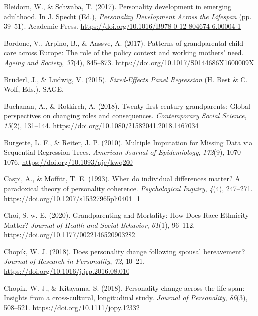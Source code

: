 \documentclass[
  english,
  man,floatsintext]{apa7}
\begin{document}
\leavevmode\hypertarget{ref-bleidornPersonalityDevelopmentEmerging2017}{}%
Bleidorn, W., \& Schwaba, T. (2017). Personality development in emerging adulthood. In J. Specht (Ed.), \emph{Personality Development Across the Lifespan} (pp. 39--51). Academic Press. \url{https://doi.org/10.1016/B978-0-12-804674-6.00004-1}

\leavevmode\hypertarget{ref-bordonePatternsGrandparentalChild2017}{}%
Bordone, V., Arpino, B., \& Aassve, A. (2017). Patterns of grandparental child care across Europe: The role of the policy context and working mothers' need. \emph{Ageing and Society}, \emph{37}(4), 845--873. \url{https://doi.org/10.1017/S0144686X1600009X}

\leavevmode\hypertarget{ref-bruderlFixedEffectsPanelRegression2015}{}%
Brüderl, J., \& Ludwig, V. (2015). \emph{Fixed-Effects Panel Regression} (H. Best \& C. Wolf, Eds.). SAGE.

\leavevmode\hypertarget{ref-buchananTwentyfirstCenturyGrandparents2018}{}%
Buchanan, A., \& Rotkirch, A. (2018). Twenty-first century grandparents: Global perspectives on changing roles and consequences. \emph{Contemporary Social Science}, \emph{13}(2), 131--144. \url{https://doi.org/10.1080/21582041.2018.1467034}

\leavevmode\hypertarget{ref-burgetteMultipleImputationMissing2010}{}%
Burgette, L. F., \& Reiter, J. P. (2010). Multiple Imputation for Missing Data via Sequential Regression Trees. \emph{American Journal of Epidemiology}, \emph{172}(9), 1070--1076. \url{https://doi.org/10.1093/aje/kwq260}

\leavevmode\hypertarget{ref-caspiWhenIndividualDifferences1993}{}%
Caspi, A., \& Moffitt, T. E. (1993). When do individual differences matter? A paradoxical theory of personality coherence. \emph{Psychological Inquiry}, \emph{4}(4), 247--271. \url{https://doi.org/10.1207/s15327965pli0404_1}

\leavevmode\hypertarget{ref-choiGrandparentingMortalityHow2020}{}%
Choi, S.-w. E. (2020). Grandparenting and Mortality: How Does Race-Ethnicity Matter? \emph{Journal of Health and Social Behavior}, \emph{61}(1), 96--112. \url{https://doi.org/10.1177/0022146520903282}

\leavevmode\hypertarget{ref-chopikDoesPersonalityChange2018}{}%
Chopik, W. J. (2018). Does personality change following spousal bereavement? \emph{Journal of Research in Personality}, \emph{72}, 10--21. \url{https://doi.org/10.1016/j.jrp.2016.08.010}

\leavevmode\hypertarget{ref-chopikPersonalityChangeLife2018}{}%
Chopik, W. J., \& Kitayama, S. (2018). Personality change across the life span: Insights from a cross-cultural, longitudinal study. \emph{Journal of Personality}, \emph{86}(3), 508--521. \url{https://doi.org/10.1111/jopy.12332}
\end{document}
